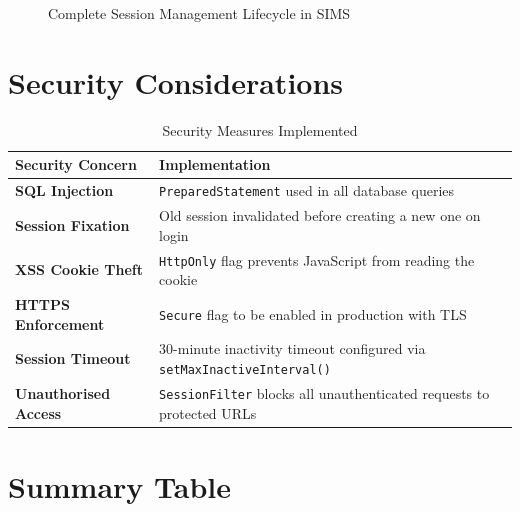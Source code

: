 \documentclass[12pt, a4paper]{article}
\begin{document}
\begin{figure}[H]
\caption{Complete Session Management Lifecycle in SIMS}
\end{figure}

\section{Security Considerations}

\begin{table}[H]
\centering
\renewcommand{\arraystretch}{1.4}
\begin{tabularx}{\textwidth}{>{\bfseries}lX}
\toprule
Security Concern & Implementation \\
\midrule
SQL Injection       & \texttt{PreparedStatement} used in all database queries \\
Session Fixation    & Old session invalidated before creating a new one on login \\
XSS Cookie Theft    & \texttt{HttpOnly} flag prevents JavaScript from reading the cookie \\
HTTPS Enforcement   & \texttt{Secure} flag to be enabled in production with TLS \\
Session Timeout     & 30-minute inactivity timeout configured via
                      \texttt{setMaxInactiveInterval()} \\
Unauthorised Access & \texttt{SessionFilter} blocks all unauthenticated requests
                      to protected URLs \\
\bottomrule
\end{tabularx}
\caption{Security Measures Implemented}
\end{table}

\section{Summary Table}
\end{document}

